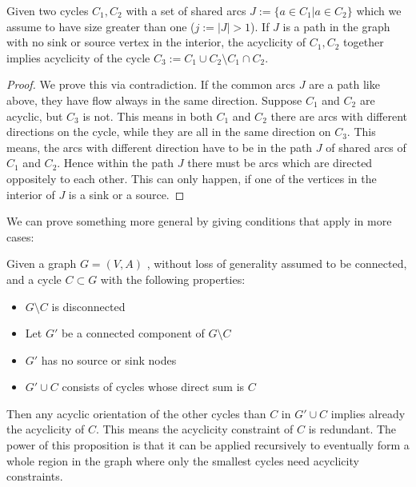 \begin{prop}
 Given two cycles $C_1, C_2$ with a set of shared arcs $J:=\{a\in C_1|a\in C_2\}$ which we assume to have size greater 
than one ($j:=|J|>1$). If $J$ is a path in the graph with no sink or source vertex in the interior, the acyclicity of 
$C_1, C_2$ together implies acyclicity of the cycle $C_3:=C_1\cup C_2\setminus C_1\cap C_2$.
\end{prop}
\begin{proof}
 We prove this via contradiction. If the common arcs $J$ are a path like above, they have flow always in the same 
direction. Suppose $C_1$ and $C_2$ are acyclic, but $C_3$ is not. This means in both $C_1$ and $C_2$ there are arcs 
with different directions on the cycle, while they are all in the same direction on $C_3$. This means, the arcs with 
different direction have to be in the path $J$ of shared arcs of $C_1$ and $C_2$. Hence within the path $J$ there must 
be arcs which are directed oppositely to each other. This can only happen, if one of the vertices in the interior of 
$J$ is a sink or a source. \Lightning
\end{proof}
We can prove something more general by giving conditions that apply in more cases:
\begin{prop}
 Given a graph $G=(V,A)$ , without loss of generality assumed to be connected, and a cycle $C\subset G$ with the 
following properties:
 \begin{itemize}
  \item $G\setminus C$ is disconnected
  \item Let $G'$ be a connected component of $G\setminus C$ 
  \item $G'$ has no source or sink nodes
  \item $G'\cup C$ consists of cycles whose direct sum is $C$ %
 \end{itemize}
 Then any acyclic orientation of the other cycles than $C$ in $G'\cup C$ implies already the acyclicity of $C$. This 
  means the acyclicity constraint of $C$ is redundant. The power of this proposition is that it can be applied 
  recursively to eventually form a whole region in the graph where only the smallest cycles need acyclicity constraints.

\end{prop}
